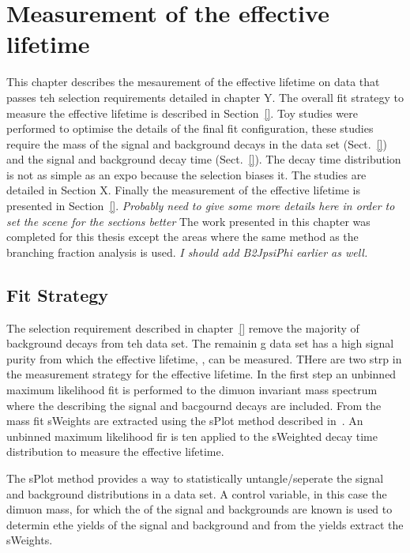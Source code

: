 \chapter{Measurement of the \bsmumu effective lifetime}
\label{sec:lifetimemeasurement}

This chapter describes the mesaurement of the \bsmumu effective lifetime on data that passes teh selection requirements detailed in chapter Y. The overall fit strategy to measure the effective lifetime is described in Section~\ref{}. Toy studies were performed to optimise the details of the final fit configuration, these studies require the mass \pdfs of the signal and background decays in the data set (Sect.~\ref{}) and the signal and background decay time \pdfs (Sect.~\ref{}). The decay time distribution is not as simple as an expo because the selection biases it. The studies are detailed in Section X. Finally the measurement of the \bsmumu effective lifetime is presented in Section~\ref{}.
{\it Probably need to give some more details here in order to set the scene for the sections better}
The work presented in this chapter was completed for this thesis except the areas where the same method as the branching fraction analysis is used. 
{\it I should add B2JpsiPhi earlier as well.}



\section{Fit Strategy}
\label{sec:fitstrategy}

The selection requirement described in chapter~\ref{} remove the majority of background decays from teh data set. The remainin g data set has a high signal purity from which the \bsmumu effective lifetime, \tmumu, can be measured. THere are two strp in the measurement strategy for the effective lifetime. In the first step an unbinned maximum likelihood fit is performed to the dimuon invariant mass spectrum where the \pdfs describing the \bsmumu signal and bacgournd decays are included. From the mass fit sWeights are extracted using the sPlot method described in~\cite{}. An unbinned maximum likelihood fir is ten applied to the sWeighted decay time distribution to measure the \bsmumu effective lifetime.

The sPlot method provides a way to statistically untangle/seperate the signal and background distributions in a data set. A control variable, in this case the dimuon mass, for which the \pdfs of the signal and backgrounds are known is used to determin ethe yields of the signal and background and from the yields extract the sWeights. %

